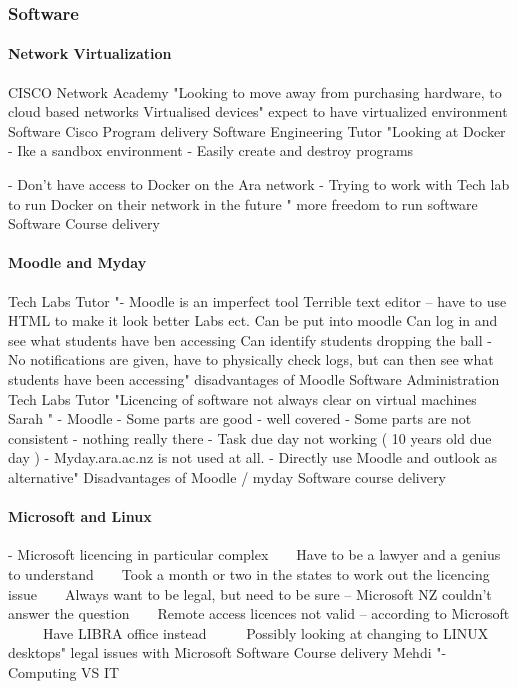 \subsubsection{Software} 

\paragraph{Network Virtualization}


CISCO Network Academy	"Looking to move away from purchasing hardware, to cloud based networks
  Virtualised devices"	expect to have virtualized environment	Software	Cisco Program delivery
Software Engineering Tutor	"Looking at Docker
- Ike a sandbox environment
- Easily create and destroy programs


- Don’t have access to Docker on the Ara network
- Trying to work with Tech lab to run Docker on their network in the future
"	more freedom to run software	Software	Course delivery

\paragraph{Moodle and Myday}

Tech Labs Tutor	"- Moodle is an imperfect tool
     Terrible text editor – have to use HTML to make it look better
     Labs ect. Can be put into moodle
     Can log in and see what students have ben accessing
     Can identify students dropping the ball
- No notifications are given, have to physically check logs, but can then see what students have been accessing"	disadvantages of Moodle	Software	Administration
Tech Labs Tutor	"Licencing of software not always clear on virtual machines
Sarah	"
-	Moodle
-	Some parts are good - well covered
-	Some parts are not consistent - nothing really there
-	Task due day not working ( 10 years old due day )
-	Myday.ara.ac.nz is not used at all.
-	Directly use Moodle and outlook as alternative"	Disadvantages of Moodle / myday	Software	course delivery

\paragraph{Microsoft and Linux}

- Microsoft licencing in particular complex
     Have to be a lawyer and a genius to understand
     Took a month or two in the states to work out the licencing issue
     Always want to be legal, but need to be sure – Microsoft NZ couldn’t answer the question
     Remote access licences not valid – according to Microsoft
       Have LIBRA office instead
       Possibly looking at changing to LINUX desktops"	legal issues with Microsoft	Software	Course delivery
Mehdi	"-	Computing VS IT

